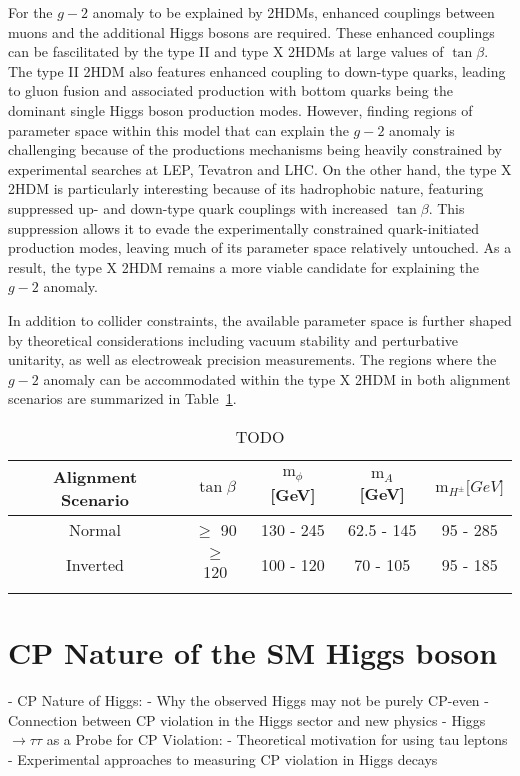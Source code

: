 For the $g-2$ anomaly to be explained by 2HDMs, enhanced couplings between muons and the additional Higgs bosons are required. These enhanced couplings can be fascilitated by the type II and type X 2HDMs at large values of $\tan{\beta}$. The type II 2HDM also features enhanced coupling to down-type quarks, leading to gluon fusion and associated production with bottom quarks being the dominant single Higgs boson production modes. However, finding regions of parameter space within this model that can explain the $g-2$ anomaly is challenging because of the productions mechanisms being heavily constrained by experimental searches at LEP, Tevatron and LHC. On the other hand, the type X 2HDM is particularly interesting because of its hadrophobic nature, featuring suppressed up- and down-type quark couplings with increased $\tan{\beta}$. This suppression allows it to evade the experimentally constrained quark-initiated production modes, leaving much of its parameter space relatively untouched. As a result, the type X 2HDM remains a more viable candidate for explaining the $g-2$ anomaly. 

In addition to collider constraints, the available parameter space is further shaped by theoretical considerations including vacuum stability and perturbative unitarity, as well as electroweak precision measurements. The regions where the $g-2$ anomaly can be accommodated within the type X 2HDM in both alignment scenarios are summarized in Table~\ref{Table:Chapter2_TypeX-ParameterSpace}.

\begin{table}[h]
\centering
\renewcommand{\arraystretch}{1.5} %
\setlength{\tabcolsep}{12pt} %
\begin{tabular}{|c|c|c|c|c|}
\hline
Alignment Scenario & $\tan{\beta}$ & $\text{m}_\phi$ {[}GeV{]} & $\text{m}_A$ {[}GeV{]} & $\text{m}_{H^\pm} {[}GeV{]}$ \\ \hline \hline
Normal             & $\geq$ 90     & 130 - 245                 & 62.5 - 145             & 95 - 285                     \\ \arrayrulecolor{lightgray} \hline
Inverted           & $\geq$ 120    & 100 - 120                 & 70 - 105               & 95 - 185 \\ \arrayrulecolor{black} \hline
\end{tabular}
\caption{TODO}
\label{Table:Chapter2_TypeX-ParameterSpace}
\end{table}

\section{CP Nature of the SM Higgs boson}
- CP Nature of Higgs:
- Why the observed Higgs may not be purely CP-even
- Connection between CP violation in the Higgs sector and new physics
- Higgs $\rightarrow \tau \tau$ as a Probe for CP Violation:
- Theoretical motivation for using tau leptons
- Experimental approaches to measuring CP violation in Higgs decays